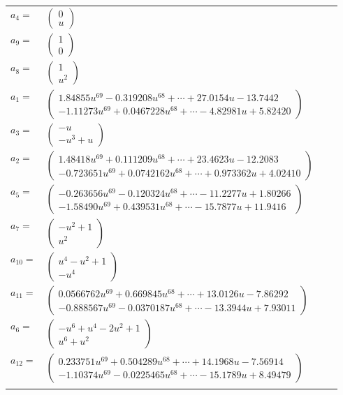 \documentclass[1p]{elsarticle_modified}
\theoremstyle{definition}
\begin{document}
\begin{tabular}{m{7pt} m{180pt} m{7pt} m{180pt} }
\flushright $a_{4}=$&$\begin{pmatrix}0\\u\end{pmatrix}$ \\
\flushright $a_{9}=$&$\begin{pmatrix}1\\0\end{pmatrix}$ \\
\flushright $a_{8}=$&$\begin{pmatrix}1\\u^2\end{pmatrix}$ \\
\flushright $a_{1}=$&$\begin{pmatrix}1.84855 u^{69}-0.319208 u^{68}+\cdots+27.0154 u-13.7442\\-1.11273 u^{69}+0.0467228 u^{68}+\cdots-4.82981 u+5.82420\end{pmatrix}$ \\
\flushright $a_{3}=$&$\begin{pmatrix}- u\\- u^3+u\end{pmatrix}$ \\
\flushright $a_{2}=$&$\begin{pmatrix}1.48418 u^{69}+0.111209 u^{68}+\cdots+23.4623 u-12.2083\\-0.723651 u^{69}+0.0742162 u^{68}+\cdots+0.973362 u+4.02410\end{pmatrix}$ \\
\flushright $a_{5}=$&$\begin{pmatrix}-0.263656 u^{69}-0.120324 u^{68}+\cdots-11.2277 u+1.80266\\-1.58490 u^{69}+0.439531 u^{68}+\cdots-15.7877 u+11.9416\end{pmatrix}$ \\
\flushright $a_{7}=$&$\begin{pmatrix}- u^2+1\\u^2\end{pmatrix}$ \\
\flushright $a_{10}=$&$\begin{pmatrix}u^4- u^2+1\\- u^4\end{pmatrix}$ \\
\flushright $a_{11}=$&$\begin{pmatrix}0.0566762 u^{69}+0.669845 u^{68}+\cdots+13.0126 u-7.86292\\-0.888567 u^{69}-0.0370187 u^{68}+\cdots-13.3944 u+7.93011\end{pmatrix}$ \\
\flushright $a_{6}=$&$\begin{pmatrix}- u^6+u^4-2 u^2+1\\u^6+u^2\end{pmatrix}$ \\
\flushright $a_{12}=$&$\begin{pmatrix}0.233751 u^{69}+0.504289 u^{68}+\cdots+14.1968 u-7.56914\\-1.10374 u^{69}-0.0225465 u^{68}+\cdots-15.1789 u+8.49479\end{pmatrix}$\\&\end{tabular}
\end{document}

